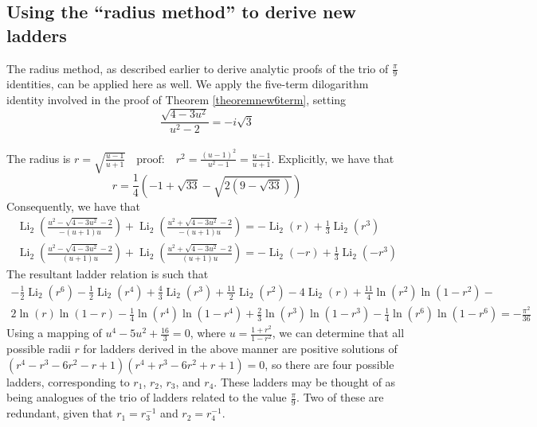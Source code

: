 \documentclass[12pt]{article}
\begin{document}
\subsection{Using the ``radius method'' to derive new ladders}
 The radius method, as described earlier to derive analytic proofs of the trio of $\frac{\pi}{9}$ identities, can be applied here as well. 
 We apply the five-term dilogarithm identity involved in the proof of Theorem \ref{theoremnew6term}, setting 
\begin{equation*}
\frac{\sqrt{4-3u^2}}{ u^2 - 2} = -i \sqrt{3}
\end{equation*}
\\
The radius is $r = \sqrt{\frac{u - 1}{u + 1}} \quad \text{proof:} \quad r^2 = \frac{(u - 1)^2}{u^2 - 1} = \frac{u - 1}{u + 1} $. 
 Explicitly, we have that 
\begin{equation}\label{radiusfornewladder1}
 r=\frac{1}{4} \left( -1 + \sqrt{33} - \sqrt{2 \left(9 - \sqrt{33} \right)} \right) 
\end{equation}
 Consequently, we have that 
\begin{equation*}
\begin{aligned}
\operatorname{Li}_2\left( \frac{u^2 - \sqrt{4 - 3 u^2} - 2}{-(u + 1) u} \right)
+ \operatorname{Li}_2\left( \frac{u^2 + \sqrt{4 - 3 u^2} - 2}{-(u + 1) u} \right)
= -\operatorname{Li}_2(r) + \frac{1}{3} \operatorname{Li}_2(r^3)\\
\operatorname{Li}_2\left( \frac{u^2 - \sqrt{4 - 3 u^2} - 2}{(u + 1) u} \right)
+ \operatorname{Li}_2\left( \frac{u^2 + \sqrt{4 - 3 u^2} - 2}{(u + 1) u} \right)
= -\operatorname{Li}_2(-r) + \frac{1}{3} \operatorname{Li}_2(-r^3)
\end{aligned}
\end{equation*}
 The resultant ladder relation is such that 
\begin{multline*}
 -\frac{1}{2} \operatorname{Li}_2(r^6) - \frac{1}{2} \operatorname{Li}_2(r^4) + \frac{4}{3} \operatorname{Li}_2(r^3) + 
 \frac{11}{2} \operatorname{Li}_2(r^2) - 4 \operatorname{Li}_2(r) + 
 \frac{11}{4} \ln(r^2)\ln(1 - r^2) - \\ 
 2 \ln(r)\ln(1 - r) - \frac{1}{4} \ln(r^4)\ln(1 - r^4) + \frac{2}{3} \ln(r^3)\ln(1 - r^3) - \frac{1}{4} \ln(r^6)\ln(1 - r^6) = -\frac{\pi^2}{36} 
\end{multline*}
 Using a mapping of $u^4 - 5 u^2 + \frac{16}{3} = 0$, where $u = \frac{1+r^2}{1 - r^2}$, we can determine that 
 all possible radii $r$ for ladders derived in the above manner are positive solutions of $(r^4 - r^3 - 6 r^2 - r + 
 1) (r^4 + r^3 - 6 r^2 + r + 1) = 0$, so there are four possible ladders, corresponding to $r_1$, $r_2$, $r_3$, and $r_4$. 
 These ladders may be thought of as being analogues of the trio of ladders related to the value $\frac{\pi}{9}$. Two of these are 
 redundant, given that $r_1=r_3^{-1}$ and $r_2=r_4^{-1}$. 
\end{document}
